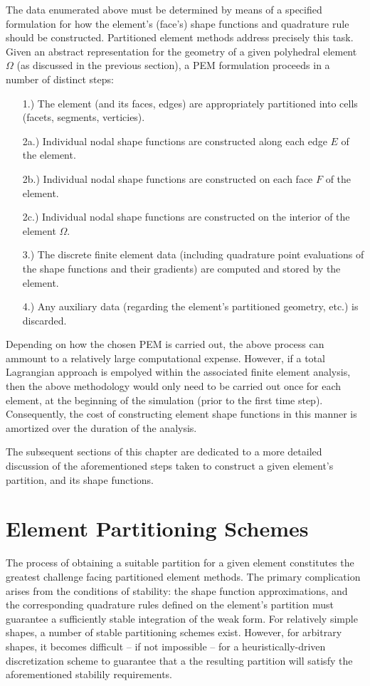 	The data enumerated above must be determined by means of a specified formulation for how the element's (face's) shape functions and quadrature rule should be constructed. Partitioned element methods address precisely this task. Given an abstract representation for the geometry of a given polyhedral element $\Omega$ (as discussed in the previous section), a PEM formulation proceeds in a number of distinct steps:
	\begin{itemize}
		\item[1.)] The element (and its faces, edges) are appropriately partitioned into cells (facets, segments, verticies).
		\item[2a.)] Individual nodal shape functions are constructed along each edge $E$ of the element.
		\item[2b.)] Individual nodal shape functions are constructed on each face $F$ of the element.
		\item[2c.)] Individual nodal shape functions are constructed on the interior of the element $\Omega$.
		\item[3.)] The discrete finite element data (including quadrature point evaluations of the shape functions and their gradients) are computed and stored by the element.
		\item[4.)] Any auxiliary data (regarding the element's partitioned geometry, etc.) is discarded.
	\end{itemize}
	
	Depending on how the chosen PEM is carried out, the above process can ammount to a relatively large computational expense. However, if a total Lagrangian approach is empolyed within the associated finite element analysis, then the above methodology would only need to be carried out once for each element, at the beginning of the simulation (prior to the first time step). Consequently, the cost of constructing element shape functions in this manner is amortized over the duration of the analysis.
	
	The subsequent sections of this chapter are dedicated to a more detailed discussion of the aforementioned steps taken to construct a given element's partition, and its shape functions.
	
\section{Element Partitioning Schemes}

	The process of obtaining a suitable partition for a given element constitutes the greatest challenge facing partitioned element methods. The primary complication arises from the conditions of stability: the shape function approximations, and the corresponding quadrature rules defined on the element's partition must guarantee a sufficiently stable integration of the weak form. For relatively simple shapes, a number of stable partitioning schemes exist. However, for arbitrary shapes, it becomes difficult -- if not impossible -- for a heuristically-driven discretization scheme to guarantee that a the resulting partition will satisfy the aforementioned stabilily requirements.

